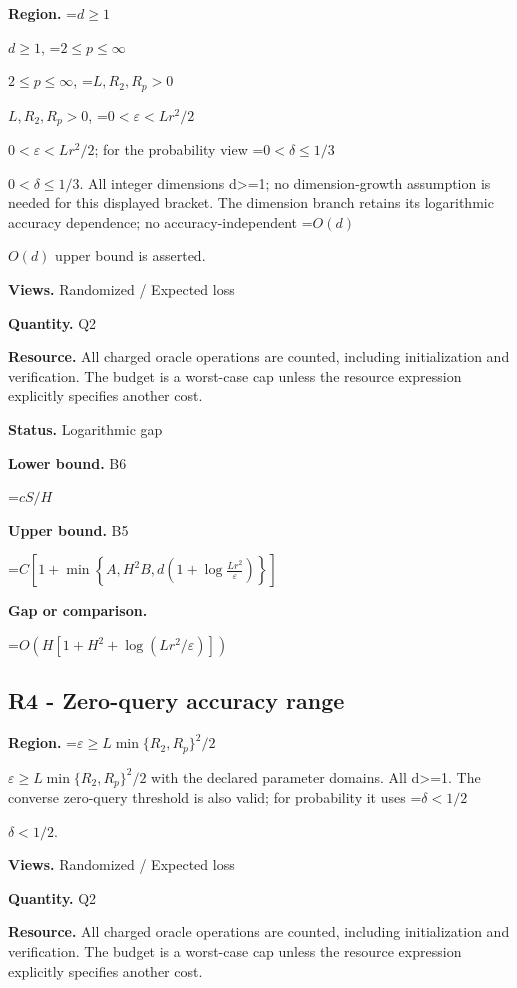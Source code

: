 \documentclass[10pt,a4paper]{article}
\newcommand{\AtlasMath}[1]{\par\begingroup\centering\setbox0=\hbox{$\displaystyle #1$}\ifdim\wd0>1.4\linewidth\typeout{ATLAS WIDE FORMULA: \the\wd0}\fi\ifdim\wd0>\linewidth\resizebox{\linewidth}{!}{\box0}\else\box0\fi\par\endgroup}
\newcommand{\AtlasInlineMath}[1]{\begingroup\setbox0=\hbox{$#1$}\ifdim\wd0>.4\linewidth\endgroup\AtlasMath{#1}\else\endgroup$#1$\fi}
\begin{document}
\textbf{Region.} \AtlasInlineMath{d\ge1}, \AtlasInlineMath{2\le p\le\infty}, \AtlasInlineMath{L,R_2,R_p>0}, \AtlasInlineMath{0<\varepsilon<Lr^2/2}; for the probability view \AtlasInlineMath{0<\delta\le1/3}. All integer dimensions d>=1; no dimension-growth assumption is needed for this displayed bracket. The dimension branch retains its logarithmic accuracy dependence; no accuracy-independent \AtlasInlineMath{O(d)} upper bound is asserted.



\textbf{Views.} Randomized / Expected loss



\textbf{Quantity.} Q2



\textbf{Resource.} All charged oracle operations are counted, including initialization and verification. The budget is a worst-case cap unless the resource expression explicitly specifies another cost.



\textbf{Status.} Logarithmic gap



\textbf{Lower bound.} B6



\AtlasMath{cS/H}


\textbf{Upper bound.} B5



\AtlasMath{C\left[1+\min\left\{A,H^2B,d\left(1+\log\frac{Lr^2}{\varepsilon}\right)\right\}\right]}


\textbf{Gap or comparison.}



\AtlasMath{O\!\left(H[1+H^2+\log(Lr^2/\varepsilon)]\right)}


\subsection{R4 - Zero-query accuracy range}


\textbf{Region.} \AtlasInlineMath{\varepsilon\ge L\min\{R_2,R_p\}^2/2} with the declared parameter domains. All d>=1. The converse zero-query threshold is also valid; for probability it uses \AtlasInlineMath{\delta<1/2}.



\textbf{Views.} Randomized / Expected loss



\textbf{Quantity.} Q2



\textbf{Resource.} All charged oracle operations are counted, including initialization and verification. The budget is a worst-case cap unless the resource expression explicitly specifies another cost.
\end{document}
